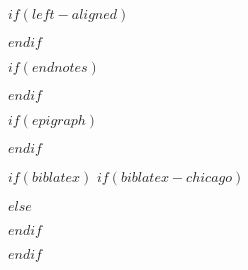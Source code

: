 

\usepackage{etoolbox}
$if(left-aligned)$
  \usepackage[document]{ragged2e}
  \setlength{\RaggedRightParindent}{\parindent}
  \setlength{\RaggedRightRightskip}{0pt plus 3em}
$endif$

$if(endnotes)$
  \usepackage{endnotes}
  \renewcommand{\enotesize}{\normalsize}
  \let\footnote=\endnote
$endif$


\usepackage{fancyhdr}
\setlength{\headheight}{0.25in}
\renewcommand{\headrulewidth}{0pt}
\renewcommand{\footrulewidth}{0pt}


\pagestyle{normal}


$if(epigraph)$
  \usepackage{epigraph}
  \renewcommand{\epigraphsize}{\footnotesize}
  \setlength{\epigraphrule}{0em}
  \setlength{\beforeepigraphskip}{0em}
  \setlength{\afterepigraphskip}{1em}
$endif$


$if(biblatex)$
  $if(biblatex-chicago)$
    \usepackage[$if(biblio-style)$$biblio-style$,$endif$$for(biblatexoptions)$$biblatexoptions$$sep$,$endfor$]{biblatex-chicago}
  $else$
    \usepackage[$if(biblio-style)$style=$biblio-style$,$endif$$for(biblatexoptions)$$biblatexoptions$$sep$,$endfor$]{biblatex}
  $endif$

  \setlength\bibitemsep{0pt}
  \setlength\bibhang{\parindent}

  

  \pretocmd{\printbibliography}{\clearpage}{}{}
$endif$


\usepackage{authblk}
\renewcommand*{\Authsep}{, }
\renewcommand*{\Authand}{ and }
\renewcommand*{\Authands}{, and }
\renewcommand*{\Affilfont}{\normalsize}
\renewcommand*{\Authfont}{\normalsize}

